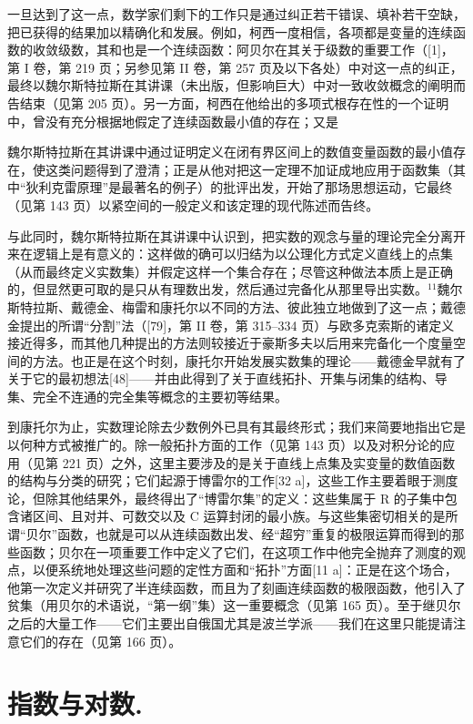 一旦达到了这一点，数学家们剩下的工作只是通过纠正若干错误、填补若干空缺，把已获得的结果加以精确化和发展。例如，柯西一度相信，各项都是变量的连续函数的收敛级数，其和也是一个连续函数：阿贝尔在其关于级数的重要工作（{[}1{]}，第 I 卷，第 219 页；另参见第 II 卷，第 257 页及以下各处）中对这一点的纠正，最终以魏尔斯特拉斯在其讲课（未出版，但影响巨大）中对一致收敛概念的阐明而告结束（见第 205 页）。另一方面，柯西在他给出的多项式根存在性的一个证明中，曾没有充分根据地假定了连续函数最小值的存在；又是

魏尔斯特拉斯在其讲课中通过证明定义在闭有界区间上的数值变量函数的最小值存在，使这类问题得到了澄清；正是从他对把这一定理不加证成地应用于函数集（其中“狄利克雷原理”是最著名的例子）的批评出发，开始了那场思想运动，它最终（见第 143 页）以紧空间的一般定义和该定理的现代陈述而告终。

与此同时，魏尔斯特拉斯在其讲课中认识到，把实数的观念与量的理论完全分离开来在逻辑上是有意义的：这样做的确可以归结为以公理化方式定义直线上的点集（从而最终定义实数集）并假定这样一个集合存在；尽管这种做法本质上是正确的，但显然更可取的是只从有理数出发，然后通过完备化从那里导出实数。\(^{11}\)魏尔斯特拉斯、戴德金、梅雷和康托尔以不同的方法、彼此独立地做到了这一点；戴德金提出的所谓“分割”法（{[}79{]}，第 II 卷，第 315–334 页）与欧多克索斯的诸定义接近得多，而其他几种提出的方法则较接近于豪斯多夫以后用来完备化一个度量空间的方法。也正是在这个时刻，康托尔开始发展实数集的理论——戴德金早就有了关于它的最初想法{[}48{]}——并由此得到了关于直线拓扑、开集与闭集的结构、导集、完全不连通的完全集等概念的主要初等结果。

到康托尔为止，实数理论除去少数例外已具有其最终形式；我们来简要地指出它是以何种方式被推广的。除一般拓扑方面的工作（见第 143 页）以及对积分论的应用（见第 221 页）之外，这里主要涉及的是关于直线上点集及实变量的数值函数的结构与分类的研究；它们起源于博雷尔的工作{[}32 a{]}，这些工作主要着眼于测度论，但除其他结果外，最终得出了“博雷尔集”的定义：这些集属于 R 的子集中包含诸区间、且对并、可数交以及 C 运算封闭的最小族。与这些集密切相关的是所谓“贝尔”函数，也就是可以从连续函数出发、经“超穷”重复的极限运算而得到的那些函数；贝尔在一项重要工作中定义了它们，在这项工作中他完全抛弃了测度的观点，以便系统地处理这些问题的定性方面和“拓扑”方面{[}11 a{]}：正是在这个场合，他第一次定义并研究了半连续函数，而且为了刻画连续函数的极限函数，他引入了贫集（用贝尔的术语说，“第一纲”集）这一重要概念（见第 165 页）。至于继贝尔之后的大量工作——它们主要出自俄国尤其是波兰学派——我们在这里只能提请注意它们的存在（见第 166 页）。

\chapter{指数与对数.}

